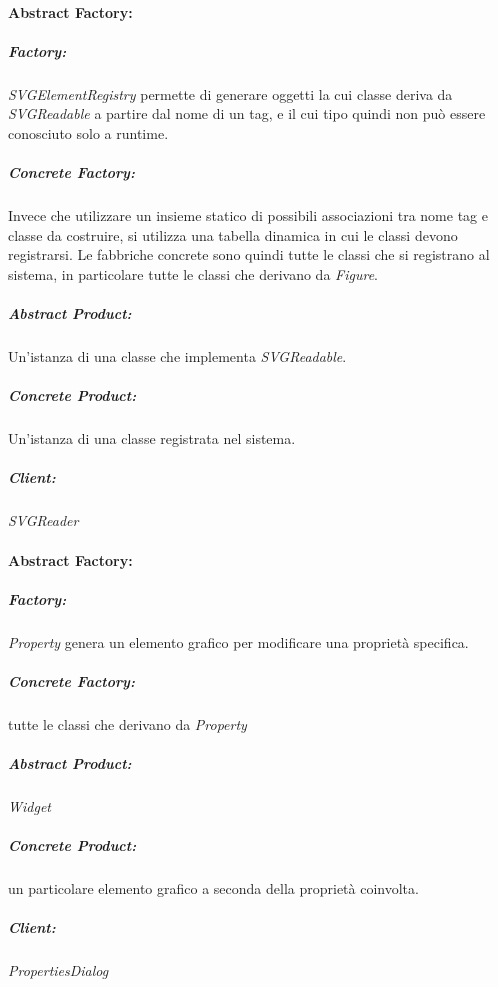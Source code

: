 \paragraph{Abstract Factory:}
\subparagraph{Factory:} \textit{SVGElementRegistry} permette di generare oggetti la cui classe deriva da \textit{SVGReadable} a partire dal nome di un tag, e il cui tipo quindi non pu\`o essere conosciuto solo a runtime.
\subparagraph{Concrete Factory:} Invece che utilizzare un insieme statico di possibili associazioni tra nome tag e classe da costruire, si utilizza una tabella dinamica in cui le classi devono registrarsi. Le fabbriche concrete sono quindi tutte le classi che si registrano al sistema, in particolare tutte le classi che derivano da \textit{Figure}.
\subparagraph{Abstract Product:} Un'istanza di una classe che implementa \textit{SVGReadable}.
\subparagraph{Concrete Product:} Un'istanza di una classe registrata nel sistema.
\subparagraph{Client:} \textit{SVGReader}

\paragraph{Abstract Factory:} 
\subparagraph{Factory:} \textit{Property} genera un elemento grafico per modificare una propriet\`a specifica.
\subparagraph{Concrete Factory:} tutte le classi che derivano da \textit{Property}
\subparagraph{Abstract Product:} \textit{Widget}
\subparagraph{Concrete Product:} un particolare elemento grafico a seconda della propriet\`a coinvolta.
\subparagraph{Client:} \textit{PropertiesDialog}


